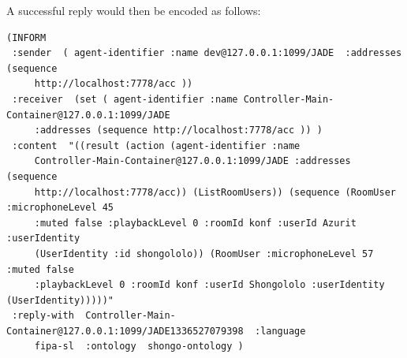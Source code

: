 \documentclass[a4paper]{report}
\begin{document}
A successful reply would then be encoded as follows:
\begin{verbatim}
(INFORM
 :sender  ( agent-identifier :name dev@127.0.0.1:1099/JADE  :addresses (sequence
     http://localhost:7778/acc ))
 :receiver  (set ( agent-identifier :name Controller-Main-Container@127.0.0.1:1099/JADE
     :addresses (sequence http://localhost:7778/acc )) )
 :content  "((result (action (agent-identifier :name
     Controller-Main-Container@127.0.0.1:1099/JADE :addresses (sequence
     http://localhost:7778/acc)) (ListRoomUsers)) (sequence (RoomUser :microphoneLevel 45
     :muted false :playbackLevel 0 :roomId konf :userId Azurit :userIdentity
     (UserIdentity :id shongololo)) (RoomUser :microphoneLevel 57 :muted false
     :playbackLevel 0 :roomId konf :userId Shongololo :userIdentity (UserIdentity)))))"
 :reply-with  Controller-Main-Container@127.0.0.1:1099/JADE1336527079398  :language
     fipa-sl  :ontology  shongo-ontology )
\end{verbatim}






\end{document}
